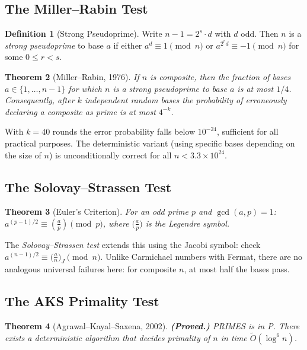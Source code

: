 \documentclass[12pt,a4paper]{amsart}
\newtheorem{theorem}{Theorem}[section]
\theoremstyle{definition}
\newtheorem{definition}[theorem]{Definition}
\begin{document}
\subsection{The Miller--Rabin Test}

\begin{definition}[Strong Pseudoprime]
Write $n-1 = 2^s \cdot d$ with $d$ odd. Then $n$ is a \emph{strong pseudoprime}
to base $a$ if either $a^d \equiv 1 \pmod{n}$ or $a^{2^r d} \equiv -1 \pmod{n}$
for some $0 \le r < s$.
\end{definition}

\begin{theorem}[Miller--Rabin, 1976]
If $n$ is composite, then the fraction of bases $a \in \{1,\ldots,n-1\}$ for
which $n$ is a strong pseudoprime to base $a$ is at most $1/4$. Consequently,
after $k$ independent random bases the probability of erroneously declaring
a composite as prime is at most $4^{-k}$.
\end{theorem}

With $k=40$ rounds the error probability falls below $10^{-24}$, sufficient for
all practical purposes. The deterministic variant (using specific bases depending
on the size of $n$) is unconditionally correct for all $n < 3.3 \times 10^{24}$.

\subsection{The Solovay--Strassen Test}

\begin{theorem}[Euler's Criterion]
For an odd prime $p$ and $\gcd(a,p)=1$:
$a^{(p-1)/2} \equiv \left(\frac{a}{p}\right) \pmod{p}$,
where $\bigl(\frac{a}{p}\bigr)$ is the Legendre symbol.
\end{theorem}

The \emph{Solovay--Strassen test} extends this using the Jacobi symbol:
check $a^{(n-1)/2} \equiv \bigl(\frac{a}{n}\bigr)_{\!J} \pmod{n}$. Unlike
Carmichael numbers with Fermat, there are no analogous universal
failures here: for composite $n$, at most half the bases pass.

\subsection{The AKS Primality Test}

\begin{theorem}[Agrawal--Kayal--Saxena, 2002]
\textbf{(Proved.)} \emph{PRIMES is in P.} There exists a deterministic algorithm
that decides primality of $n$ in time $\tilde{O}(\log^6 n)$.
\end{theorem}
\end{document}
